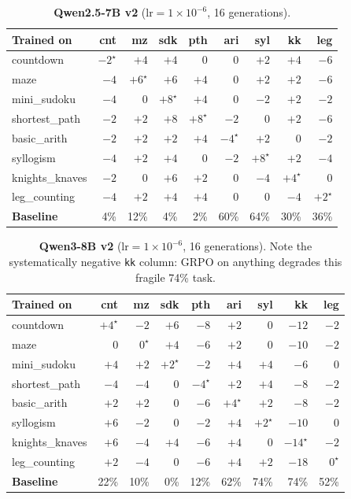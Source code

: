 \documentclass{article}
\begin{document}
\begin{table}[h]
\centering\small
\caption{\textbf{Qwen2.5-7B v2} ($\mathrm{lr}{=}1{\times}10^{-6}$, 16 generations).}
\begin{tabular}{lrrrrrrrr}
\toprule
Trained on & cnt & mz & sdk & pth & ari & syl & kk & leg\\
\midrule
countdown      & $-2^\star$ & $+4$ & $+4$ & $0$ & $0$ & $+2$ & $+4$ & $-6$\\
maze           & $-4$ & $+6^\star$ & $+6$ & $+4$ & $0$ & $+2$ & $+2$ & $-6$\\
mini\_sudoku   & $-4$ & $0$ & $+8^\star$ & $+4$ & $0$ & $-2$ & $+2$ & $-2$\\
shortest\_path & $-2$ & $+2$ & $+8$ & $+8^\star$ & $-2$ & $0$ & $+2$ & $-6$\\
basic\_arith   & $-2$ & $+2$ & $+2$ & $+4$ & $-4^\star$ & $+2$ & $0$ & $-2$\\
syllogism      & $-4$ & $+2$ & $+4$ & $0$ & $-2$ & $+8^\star$ & $+2$ & $-4$\\
knights\_knaves& $-2$ & $0$ & $+6$ & $+2$ & $0$ & $-4$ & $+4^\star$ & $0$\\
leg\_counting  & $-4$ & $+2$ & $+4$ & $+4$ & $0$ & $0$ & $-4$ & $+2^\star$\\
\midrule
\textbf{Baseline} & 4\% & 12\% & 4\% & 2\% & 60\% & 64\% & 30\% & 36\%\\
\bottomrule
\end{tabular}
\end{table}

\begin{table}[h]
\centering\small
\caption{\textbf{Qwen3-8B v2} ($\mathrm{lr}{=}1{\times}10^{-6}$, 16 generations). Note the
systematically negative \texttt{kk} column: GRPO on anything degrades this fragile 74\% task.}
\begin{tabular}{lrrrrrrrr}
\toprule
Trained on & cnt & mz & sdk & pth & ari & syl & kk & leg\\
\midrule
countdown      & $+4^\star$ & $-2$ & $+6$ & $-8$ & $+2$ & $0$ & $-12$ & $-2$\\
maze           & $0$ & $0^\star$ & $+4$ & $-6$ & $+2$ & $0$ & $-10$ & $-2$\\
mini\_sudoku   & $+4$ & $+2$ & $+2^\star$ & $-2$ & $+4$ & $+4$ & $-6$ & $0$\\
shortest\_path & $-4$ & $-4$ & $0$ & $-4^\star$ & $+2$ & $+4$ & $-8$ & $-2$\\
basic\_arith   & $+2$ & $+2$ & $0$ & $-6$ & $+4^\star$ & $+2$ & $-8$ & $-2$\\
syllogism      & $+6$ & $-2$ & $0$ & $-2$ & $+4$ & $+2^\star$ & $-10$ & $0$\\
knights\_knaves& $+6$ & $-4$ & $+4$ & $-6$ & $+4$ & $0$ & $-14^\star$ & $-2$\\
leg\_counting  & $+2$ & $-4$ & $0$ & $-6$ & $+4$ & $+2$ & $-18$ & $0^\star$\\
\midrule
\textbf{Baseline} & 22\% & 10\% & 0\% & 12\% & 62\% & 74\% & 74\% & 52\%\\
\bottomrule
\end{tabular}
\end{table}
\end{document}
